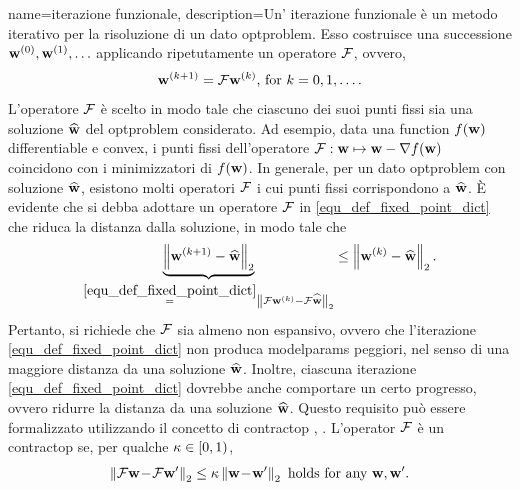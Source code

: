 {name={iterazione funzionale},
	description={Un' iterazione funzionale è un metodo iterativo per la risoluzione 
		di un dato  \gls{optproblem}. Esso costruisce una successione ${\bf w}^{(0)}, {\bf w}^{(1)},\ldots$  
		 applicando ripetutamente un operatore $\mathcal{F}$, ovvero, 
		 \begin{equation} 
		 	\label{equ_def_fixed_point_dict} 
		 	{\bf w}^{(k+1)} = \mathcal{F} {\bf w}^{(k)} \mbox{, for } k=0,1,\ldots.
		 \end{equation} 
		 L'operatore $\mathcal{F}$ è scelto in modo tale che ciascuno dei suoi punti fissi sia una soluzione 
		 $\widehat{{\bf w}}$ del \gls{optproblem} considerato. Ad esempio, data una \gls{function} $f({\bf w})$ 
		 \gls{differentiable} e \gls{convex}, i punti fissi dell'operatore $\mathcal{F}: {\bf w} \mapsto {\bf w} - \nabla f({\bf w})$ 
		 coincidono con i minimizzatori di $f({\bf w})$. In generale, per un dato \gls{optproblem} con soluzione $\widehat{{\bf w}}$, 
		 esistono molti operatori $\mathcal{F}$ i cui punti fissi corrispondono a $\widehat{{\bf w}}$. 
		 È evidente che si debba adottare un operatore $\mathcal{F}$ in \eqref{equ_def_fixed_point_dict} che riduca la distanza dalla soluzione, in modo tale che
		\begin{equation} 
			\nonumber
			\underbrace{\left\Vert { {\bf w}^{(k+1)} - \widehat{\mathbf{w}}} \right\Vert_{2}}_{\stackrel{\eqref{equ_def_fixed_point_dict}}{=} \left\Vert { \mathcal{F}{\bf w}^{(k)} - \mathcal{F}\widehat{{\bf w}}} \right\Vert_{2}}  \leq 	\left\Vert { {\bf w}^{(k)} - \widehat{{\bf w}}} \right\Vert_{2}. 
		\end{equation}
		Pertanto, si richiede che $\mathcal{F}$ sia almeno non espansivo, ovvero che l'iterazione \eqref{equ_def_fixed_point_dict} 
		non produca \glspl{modelparam} peggiori, nel senso di una maggiore distanza da una soluzione $\widehat{{\bf w}}$. 
		Inoltre, ciascuna iterazione \eqref{equ_def_fixed_point_dict} dovrebbe anche comportare un certo progresso, 
		ovvero ridurre la distanza da una soluzione $\widehat{{\bf w}}$. Questo requisito può essere formalizzato utilizzando 
		il concetto di \gls{contractop} \cite{Bauschke:2017}, \cite{fixedpoinIsta}. 
		L'operator $\mathcal{F}$ è un \gls{contractop} se, per qualche $\kappa \in [0,1)$,
		\begin{equation} 
			\nonumber
			\normgeneric{ \fixedpointop \weights\!-\!\fixedpointop \weights'}{2}  \leq  \contractfac	\normgeneric{\weights\!-\!\weights'}{2} \mbox{ holds for any } \weights,\weights'.

\end{equation}}}
